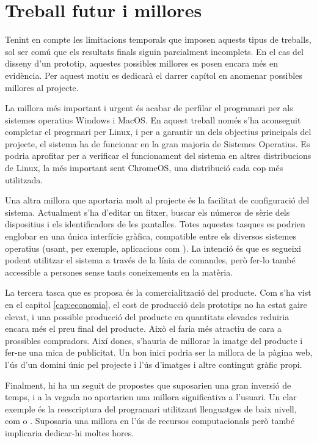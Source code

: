 \chapter{Treball futur i millores}
\label{cap:future_work}

Tenint en compte les limitacions temporals que imposen aquests tipus de
treballs, sol ser comú que els resultats finals siguin parcialment incomplets.
En el cas del disseny d'un prototip, aquestes possibles millores es posen encara
més en evidència. Per aquest motiu es dedicarà el darrer capítol en anomenar
possibles millores al projecte.

La millora més important i urgent és acabar de perfilar el programari per als
sistemes operatius Windows i MacOS. En aquest treball només s'ha aconseguit
completar el progrmari per Linux, i per a garantir un dels objectius principals
del projecte, el sistema ha de funcionar en la gran majoria de Sistemes
Operatius. Es podria aprofitar per a verificar el funcionament del sistema en
altres distribucions de Linux, la més important sent ChromeOS, una distribució
cada cop més utilitzada.

Una altra millora que aportaria molt al projecte és la facilitat de
configuració del sistema. Actualment s'ha d'editar un fitxer, buscar els números
de sèrie dels dispositius i els identificadors de les pantalles. Totes aquestes
tasques es podrien englobar en una única interfície gràfica, compatible entre
els diversos sistemes operatius (usant, per exemple, aplicacions com
). La intenció és que es segueixi podent utilitzar el sistema a
través de la línia de comandes, però fer-lo també accessible a persones sense
tants coneixements en la matèria.

La tercera tasca que es proposa és la comercialització del producte.
Com s'ha vist en el capítol \ref{cap:economia}, el cost de producció dels
prototips no ha estat gaire elevat, i una possible producció del producte en
quantitats elevades reduïria encara més el preu final del producte. Això el
faria més atractiu de cara a prossibles compradors. Així doncs, s'hauria de
millorar la imatge del producte i fer-ne una mica de publicitat. Un bon inici
podria ser la millora de la pàgina web, l'ús d'un domini únic pel projecte
i l'ús d'imatges i altre contingut gràfic propi.

Finalment, hi ha un seguit de propostes que suposarien una gran inversió de
temps, i a la vegada no aportarien una millora significativa a l'usuari. Un clar
exemple és la reescriptura del programari utilitzant llenguatges de baix nivell,
com  o . Suposaria una millora en l'ús de recursos
computacionals però també implicaria dedicar-hi moltes hores.

